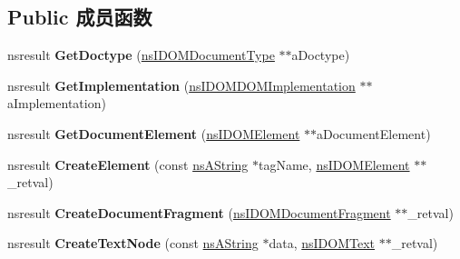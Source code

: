 \subsection*{Public 成员函数}
\begin{DoxyCompactItemize}
\item 
\mbox{\label{interfacens_i_d_o_m_document_a9fa2180ed80d70a1007ea1d8694d1d8b}} 
nsresult {\bfseries Get\+Doctype} (\hyperlink{interfacens_i_supports}{ns\+I\+D\+O\+M\+Document\+Type} $\ast$$\ast$a\+Doctype)
\item 
\mbox{\label{interfacens_i_d_o_m_document_a56c0afa265abc80212a64e6ce9428dd0}} 
nsresult {\bfseries Get\+Implementation} (\hyperlink{interfacens_i_supports}{ns\+I\+D\+O\+M\+D\+O\+M\+Implementation} $\ast$$\ast$a\+Implementation)
\item 
\mbox{\label{interfacens_i_d_o_m_document_a328f31e438ff8d089a2ca11c849e094f}} 
nsresult {\bfseries Get\+Document\+Element} (\hyperlink{interfacens_i_d_o_m_element}{ns\+I\+D\+O\+M\+Element} $\ast$$\ast$a\+Document\+Element)
\item 
\mbox{\label{interfacens_i_d_o_m_document_a3fea49fffc64de21f6b1e6ec972f3f6c}} 
nsresult {\bfseries Create\+Element} (const \hyperlink{structns_string_container}{ns\+A\+String} $\ast$tag\+Name, \hyperlink{interfacens_i_d_o_m_element}{ns\+I\+D\+O\+M\+Element} $\ast$$\ast$\+\_\+retval)
\item 
\mbox{\label{interfacens_i_d_o_m_document_ac04168ae9b8b8c1b8faabbb2990a5384}} 
nsresult {\bfseries Create\+Document\+Fragment} (\hyperlink{interfacens_i_d_o_m_document_fragment}{ns\+I\+D\+O\+M\+Document\+Fragment} $\ast$$\ast$\+\_\+retval)
\item 
\mbox{\label{interfacens_i_d_o_m_document_ac94aff270dc4aa51068e41def4f06601}} 
nsresult {\bfseries Create\+Text\+Node} (const \hyperlink{structns_string_container}{ns\+A\+String} $\ast$data, \hyperlink{interfacens_i_d_o_m_text}{ns\+I\+D\+O\+M\+Text} $\ast$$\ast$\+\_\+retval)
\item 
\mbox{\label{interfacens_i_d_o_m_document_a2084f3f30d814a2df84f2b2e89eeae86}} 

\end{DoxyCompactItemize}
